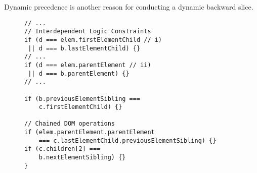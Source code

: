 Dynamic precedence is another reason for conducting a dynamic backward slice.   

\begin{figure}
\begin{lstlisting}[caption=Example code showing DOM operations that are chained and conditions that have logical constraints interdependent with each other.  To make both of these {\tt if} statements true sub conditions i) and ii) become mutually exclusive: they cannot be true at the same time.  Thus a logic solver is required to generate a satisfiable DOM structure and HTML.,label=domOr]  
// ...
// Interdependent Logic Constraints
if (d === elem.firstElementChild // i)
 || d === b.lastElementChild) {}
// ... 
if (d === elem.parentElement // ii)
 || d === b.parentElement) {}
// ...

if (b.previousElementSibling === 
    c.firstElementChild) {}

// Chained DOM operations 
if (elem.parentElement.parentElement 
    === c.lastElementChild.previousElementSibling) {}  
if (c.children[2] === 
    b.nextElementSibling) {}  
}
\end{lstlisting}
\end{figure}

